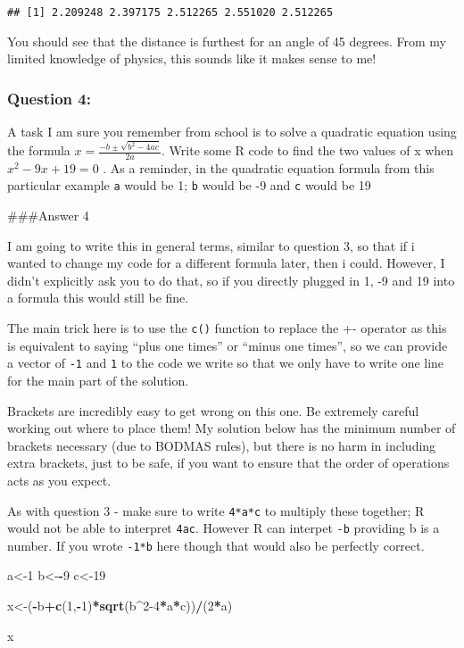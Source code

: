 \documentclass[
]{article}
\newenvironment{Shaded}{\begin{snugshade}}{\end{snugshade}}
\newcommand{\DecValTok}[1]{\textcolor[rgb]{0.00,0.00,0.81}{#1}}
\newcommand{\KeywordTok}[1]{\textcolor[rgb]{0.13,0.29,0.53}{\textbf{#1}}}
\newcommand{\NormalTok}[1]{#1}
\newcommand{\OperatorTok}[1]{\textcolor[rgb]{0.81,0.36,0.00}{\textbf{#1}}}
\begin{document}
\begin{verbatim}
## [1] 2.209248 2.397175 2.512265 2.551020 2.512265
\end{verbatim}

You should see that the distance is furthest for an angle of 45 degrees.
From my limited knowledge of physics, this sounds like it makes sense to
me!

\hypertarget{question-4}{%
\subsubsection{Question 4:}\label{question-4}}

A task I am sure you remember from school is to solve a quadratic
equation using the formula \(x=\frac{-b\pm\sqrt{b^2-4ac}}{2a}\). Write
some R code to find the two values of x when \(x^2-9x+19=0\) . As a
reminder, in the quadratic equation formula from this particular example
\texttt{a} would be 1; \texttt{b} would be -9 and \texttt{c} would be 19

\#\#\#Answer 4

I am going to write this in general terms, similar to question 3, so
that if i wanted to change my code for a different formula later, then i
could. However, I didn't explicitly ask you to do that, so if you
directly plugged in 1, -9 and 19 into a formula this would still be
fine.

The main trick here is to use the \texttt{c()} function to replace the
+- operator as this is equivalent to saying ``plus one times'' or
``minus one times'', so we can provide a vector of \texttt{-1} and
\texttt{1} to the code we write so that we only have to write one line
for the main part of the solution.

Brackets are incredibly easy to get wrong on this one. Be extremely
careful working out where to place them! My solution below has the
minimum number of brackets necessary (due to BODMAS rules), but there is
no harm in including extra brackets, just to be safe, if you want to
ensure that the order of operations acts as you expect.

As with question 3 - make sure to write \texttt{4*a*c} to multiply these
together; R would not be able to interpret \texttt{4ac}. However R can
interpet \texttt{-b} providing b is a number. If you wrote \texttt{-1*b}
here though that would also be perfectly correct.

\begin{Shaded}
\begin{Highlighting}[]
\NormalTok{a<-}\DecValTok{1}
\NormalTok{b<-}\OperatorTok{-}\DecValTok{9}
\NormalTok{c<-}\DecValTok{19}

\NormalTok{x<-(}\OperatorTok{-}\NormalTok{b}\OperatorTok{+}\KeywordTok{c}\NormalTok{(}\DecValTok{1}\NormalTok{,}\OperatorTok{-}\DecValTok{1}\NormalTok{)}\OperatorTok{*}\KeywordTok{sqrt}\NormalTok{(b}\OperatorTok{^}\DecValTok{2-4}\OperatorTok{*}\NormalTok{a}\OperatorTok{*}\NormalTok{c))}\OperatorTok{/}\NormalTok{(}\DecValTok{2}\OperatorTok{*}\NormalTok{a)}

\NormalTok{x}
\end{Highlighting}
\end{Shaded}
\end{document}
